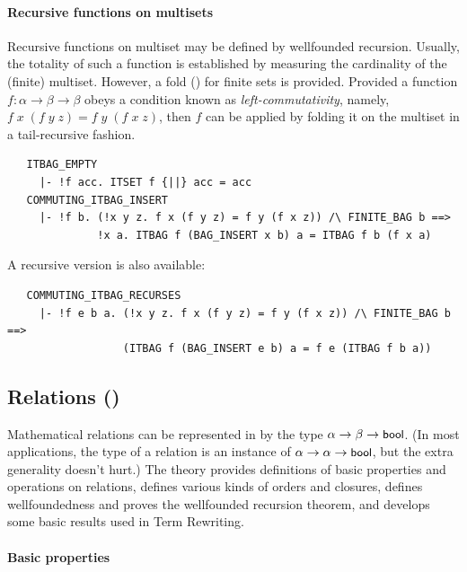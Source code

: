 {\paragraph{Recursive functions on multisets}

Recursive functions on multiset may be defined by wellfounded
recursion. Usually, the totality of such a function is established by
measuring the cardinality of the (finite) multiset. However, a fold
() for finite sets is provided.  Provided a function
$f:\alpha\to\beta\to\beta$ obeys a condition known as
\emph{left-commutativity}, namely, $f\;x\;(f\;y\;z) =
f\;y\;(f\;x\;z)$, then $f$ can be applied by folding it on the
multiset in a tail-recursive fashion.
%
\begin{hol}
\begin{verbatim}
   ITBAG_EMPTY
     |- !f acc. ITSET f {||} acc = acc
   COMMUTING_ITBAG_INSERT
     |- !f b. (!x y z. f x (f y z) = f y (f x z)) /\ FINITE_BAG b ==>
              !x a. ITBAG f (BAG_INSERT x b) a = ITBAG f b (f x a)
\end{verbatim}
\end{hol}
%
A recursive version is also available:
\begin{hol}
\begin{verbatim}
   COMMUTING_ITBAG_RECURSES
     |- !f e b a. (!x y z. f x (f y z) = f y (f x z)) /\ FINITE_BAG b ==>
                  (ITBAG f (BAG_INSERT e b) a = f e (ITBAG f b a))
\end{verbatim}
\end{hol}

\subsection{Relations ()}\label{relation}

Mathematical relations can be represented in \HOL{} by the type
$\alpha \to\beta\to\mbox{\small{\textbf{\sf{bool}}}}$. (In most applications, the type of a
relation is an instance of $\alpha \to\alpha\to\mbox{\small{\textbf{\sf{bool}}}}$, but the
extra generality doesn't hurt.) The theory 
provides definitions of basic properties and operations on relations,
defines various kinds of orders and closures, defines wellfoundedness
and proves the wellfounded recursion theorem, and develops some
basic results used in Term Rewriting.

\paragraph {Basic properties}

}
